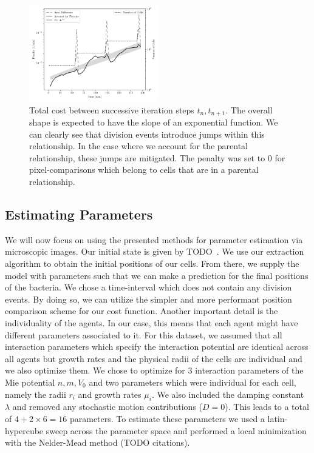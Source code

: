 \documentclass{article}
\begin{document}
\begin{figure}
    \centering
    \includegraphics[width=0.5\textwidth]
        {docs/source/_static/fitting-methods/penalty-time-flow.png}%
    \caption{
        Total cost between successive iteration steps $t_n,t_{n+1}$.
        The overall shape is expected to have the slope of an exponential function.
        We can clearly see that division events introduce jumps within this relationship.
        In the case where we account for the parental relationship, these jumps are mitigated.
        The penalty was set to $0$ for pixel-comparisons which belong to cells that are in a
        parental relationship.
    }
    \label{fig:penalty-calculation-cell-division}
\end{figure}

\subsection{Estimating Parameters}
\label{section:parameter-estimation}

We will now focus on using the presented methods for parameter estimation via microscopic images.
Our initial state is given by TODO~\cite{}.%
We use our extraction algorithm to obtain the initial positions of our cells.
From there, we supply the model with parameters such that we can make a prediction for the final
positions of the bacteria.
We chose a time-interval which does not contain any division events.
By doing so, we can utilize the simpler and more performant position comparison scheme for our cost
function.
Another important detail is the individuality of the agents.
In our case, this means that each agent might have different parameters associated to it.
For this dataset, we assumed that all interaction parameters which specify the interaction
potential are identical across all agents but growth rates and the physical radii of the cells are
individual and we also optimize them.
We chose to optimize for 3 interaction parameters of the Mie potential $n,m,V_0$ and two parameters
which were individual for each cell, namely the radii $r_i$ and growth rates $\mu_i$.
We also included the damping constant $\lambda$ and removed any stochastic motion contributions
($D=0$).
This leads to a total of $4+2\times 6=16$ parameters.
To estimate these parameters we used a latin-hypercube sweep across the parameter space and
performed a local minimization with the Nelder-Mead method (TODO citations).%
\end{document}
